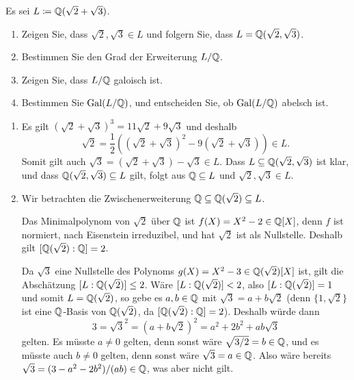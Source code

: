 \begin{question}
  Es sei $L \coloneqq \mathbb{Q}(\sqrt{2} + \sqrt{3})$.
  \begin{enumerate}
    \item
      Zeigen Sie, dass $\sqrt{2}, \sqrt{3} \in L$ und folgern Sie, dass $L = \mathbb{Q}(\sqrt{2}, \sqrt{3})$.
    \item
      Bestimmen Sie den Grad der Erweiterung $L/\mathbb{Q}$.
    \item
      Zeigen Sie, dass $L/\mathbb{Q}$ galoisch ist.
    \item
      Bestimmen Sie $\operatorname{Gal}(L/\mathbb{Q})$, und entscheiden Sie, ob $\operatorname{Gal}(L/\mathbb{Q})$ abelsch ist.
  \end{enumerate}
\end{question}


\begin{solution}
  \begin{enumerate}
    \item
      Es gilt $(\sqrt{2} + \sqrt{3})^3 = 11 \sqrt{2} + 9 \sqrt{3}$ und deshalb
      \[
            \sqrt{2}
        =   \frac{1}{2}\left( (\sqrt{2} + \sqrt{3})^2 - 9(\sqrt{2} + \sqrt{3}) \right)
        \in L.
      \]
      Somit gilt auch $\sqrt{3} = (\sqrt{2} + \sqrt{3}) - \sqrt{3} \in L$.
      Dass $L \subseteq \mathbb{Q}(\sqrt{2}, \sqrt{3})$ ist klar, und dass $\mathbb{Q}(\sqrt{2}, \sqrt{3}) \subseteq L$ gilt, folgt aus $\mathbb{Q} \subseteq L$ und $\sqrt{2}, \sqrt{3} \in L$.
      
    \item
      Wir betrachten die Zwischenerweiterung $\mathbb{Q} \subseteq \mathbb{Q}(\sqrt{2}) \subseteq L$.
      
      Das Minimalpolynom von $\sqrt{2}$ über $\mathbb{Q}$ ist $f(X) = X^2 - 2 \in \mathbb{Q}[X]$, denn $f$ ist normiert, nach Eisenstein irreduzibel, und hat $\sqrt{2}$ ist als Nullstelle.
      Deshalb gilt $[\mathbb{Q}(\sqrt{2}) : \mathbb{Q}] = 2$.
      
      Da $\sqrt{3}$ eine Nullstelle des Polynoms $g(X) = X^2 - 3 \in \mathbb{Q}(\sqrt{2})[X]$ ist, gilt die Abschätzung $[L : \mathbb{Q}(\sqrt{2})] \leq 2$.
      Wäre $[L : \mathbb{Q}(\sqrt{2})] < 2$, also $[L : \mathbb{Q}(\sqrt{2})] = 1$ und somit $L = \mathbb{Q}(\sqrt{2})$, so gebe es $a, b \in \mathbb{Q}$ mit $\sqrt{3} = a + b \sqrt{2}$ (denn $\{1, \sqrt{2}\}$ ist eine $\mathbb{Q}$-Basis von $\mathbb{Q}(\sqrt{2})$, da $[\mathbb{Q}(\sqrt{2}) : \mathbb{Q}] = 2$).
      Deshalb würde dann
      \[
          3
        = \sqrt{3}^2
        = (a + b \sqrt{2})^2
        = a^2 + 2 b^2 + ab \sqrt{3}
      \]
      gelten.
      Es müsste $a \neq 0$ gelten, denn sonst wäre $\sqrt{3/2} = b \in \mathbb{Q}$, und es müsste auch $b \neq 0$ gelten, denn sonst wäre $\sqrt{3} = a \in \mathbb{Q}$.
      Also wäre bereits $\sqrt{3} = (3 - a^2 - 2b^2)/(ab) \in \mathbb{Q}$, was aber nicht gilt.
      

\end{enumerate}
\end{solution}
